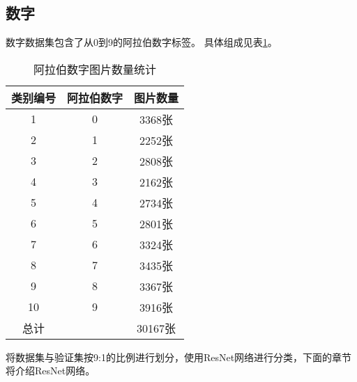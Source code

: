 \subsection{数字}

数字数据集包含了从0到9的阿拉伯数字标签。
具体组成见表\ref{tab:pic_count_arabic_numbers}。

\begin{table}[h]
	\centering
	\begin{tabular}{ccc}
		\toprule
		类别编号 & 阿拉伯数字 & 图片数量 \\
		\midrule
		1 & 0 & 3368张 \\
		2 & 1 & 2252张 \\
		3 & 2 & 2808张 \\
		4 & 3 & 2162张 \\
		5 & 4 & 2734张 \\
		6 & 5 & 2801张 \\
		7 & 6 & 3324张 \\
		8 & 7 & 3435张 \\
		9 & 8 & 3367张 \\
		10 & 9 & 3916张 \\
		\midrule
		总计 & & 30167张 \\
		\bottomrule
	\end{tabular}
	\caption{阿拉伯数字图片数量统计}
	\label{tab:pic_count_arabic_numbers}
\end{table}

将数据集与验证集按9:1的比例进行划分，使用ResNet网络进行分类，下面的章节将介绍ResNet网络。
